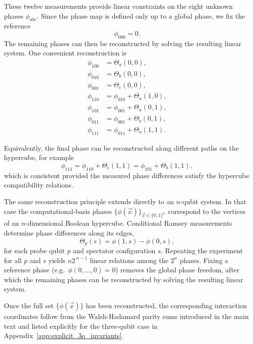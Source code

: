\medskip
\noindent
These twelve measurements provide linear constraints on the eight unknown phases $\phi_{abc}$. Since the phase map is defined only up to a global phase, we fix the reference
\[
\phi_{000}=0.
\]
The remaining phases can then be reconstructed by solving the resulting linear system. One convenient reconstruction is
\begin{align}
\phi_{100} &= \Theta_a(0,0), \\
\phi_{010} &= \Theta_b(0,0), \\
\phi_{001} &= \Theta_c(0,0), \\
\phi_{110} &= \phi_{010}+\Theta_a(1,0), \\
\phi_{101} &= \phi_{001}+\Theta_a(0,1), \\
\phi_{011} &= \phi_{001}+\Theta_b(0,1), \\
\phi_{111} &= \phi_{011}+\Theta_a(1,1).
\end{align}

\noindent
Equivalently, the final phase can be reconstructed along different paths on the hypercube, for example
\begin{equation}
\phi_{111}=\phi_{110}+\Theta_c(1,1)=\phi_{101}+\Theta_b(1,1),
\end{equation}
which is consistent provided the measured phase differences satisfy the
hypercube compatibility relations.

\medskip
\noindent
The same reconstruction principle extends directly to an $n$-qubit system. In that case the computational-basis phases $\{\phi(\vec{x})\}_{\vec{x}\in\{0,1\}^n}$ correspond to the vertices of an $n$-dimensional Boolean hypercube. Conditional Ramsey measurements determine phase differences along its edges,
\[
\Theta_p(s)=\phi(1,s)-\phi(0,s),
\]
for each probe qubit $p$ and spectator configuration $s$. Repeating the experiment for all $p$ and $s$ yields $n2^{\,n-1}$ linear relations among the $2^n$ phases. Fixing a reference phase (e.g.\ $\phi(0,\dots,0)=0$)
removes the global phase freedom, after which the remaining phases can be reconstructed by solving the resulting linear system.

\medskip
\noindent
Once the full set $\{\phi(\vec{x})\}$ has been reconstructed, the corresponding interaction coordinates follow from the Walsh-Hadamard parity sums introduced in the main text and listed explicitly for the three-qubit
case in Appendix~\ref{app:explicit_3q_invariants}.


